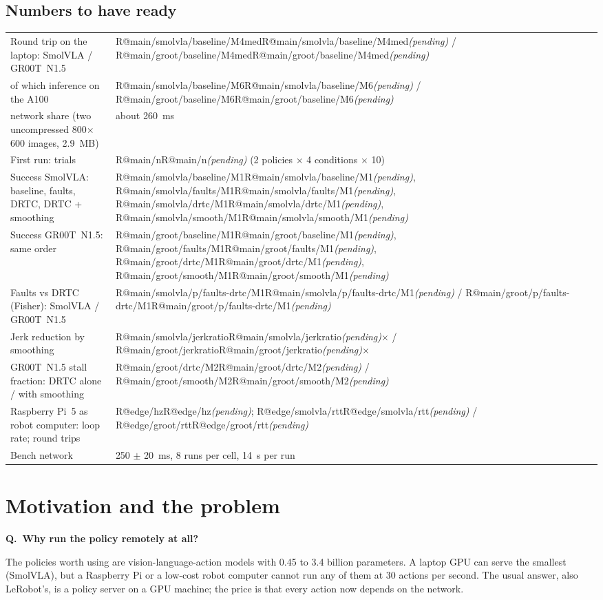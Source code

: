 \documentclass[11pt,a4paper]{article}
\makeatletter
\newcommand{\R}[1]{\ifcsname R@#1\endcsname\csname R@#1\endcsname\else\pending\fi}
\newcommand{\pending}{\textit{\color{warn}(pending)}}
\newcommand{\drtc}{DRTC}
\newcommand{\smolvla}{SmolVLA}
\newcommand{\groot}{GR00T~N1.5}
\newcounter{qn}
\newcommand{\q}[2]{\stepcounter{qn}\par\medskip
  {\bfseries\color{accent}Q\theqn.\ #1}\par\nopagebreak[4]#2\par}
\makeatother
\begin{document}
\subsection*{Numbers to have ready}
\begin{tabularx}{\textwidth}{X l}
\toprule
Round trip on the laptop: \smolvla{} / \groot{} & \R{main/smolvla/baseline/M4med} / \R{main/groot/baseline/M4med} \\
\quad of which inference on the A100 & \R{main/smolvla/baseline/M6} / \R{main/groot/baseline/M6} \\
\quad network share (two uncompressed 800$\times$600 images, 2.9~MB) & about 260~ms \\
First run: trials & \R{main/n} (2 policies $\times$ 4 conditions $\times$ 10) \\
Success \smolvla: baseline, faults, \drtc, \drtc{} + smoothing & \R{main/smolvla/baseline/M1}, \R{main/smolvla/faults/M1},
  \R{main/smolvla/drtc/M1}, \R{main/smolvla/smooth/M1} \\
Success \groot: same order & \R{main/groot/baseline/M1}, \R{main/groot/faults/M1}, \R{main/groot/drtc/M1},
  \R{main/groot/smooth/M1} \\
Faults vs \drtc{} (Fisher): \smolvla{} / \groot & \R{main/smolvla/p/faults-drtc/M1} / \R{main/groot/p/faults-drtc/M1} \\
Jerk reduction by smoothing & \R{main/smolvla/jerkratio}$\times$ / \R{main/groot/jerkratio}$\times$ \\
\groot{} stall fraction: \drtc{} alone / with smoothing & \R{main/groot/drtc/M2} / \R{main/groot/smooth/M2} \\
Raspberry Pi~5 as robot computer: loop rate; round trips & \R{edge/hz}; \R{edge/smolvla/rtt} / \R{edge/groot/rtt} \\
Bench network & 250 $\pm$ 20~ms, 8 runs per cell, 14~s per run \\
\bottomrule
\end{tabularx}

\section{Motivation and the problem}

\q{Why run the policy remotely at all?}{The policies worth using are vision-language-action models with 0.45 to 3.4
billion parameters. A laptop GPU can serve the smallest (\smolvla), but a Raspberry Pi or a low-cost robot computer
cannot run any of them at 30 actions per second. The usual answer, also LeRobot's, is a policy server on a GPU
machine; the price is that every action now depends on the network.}
\end{document}
